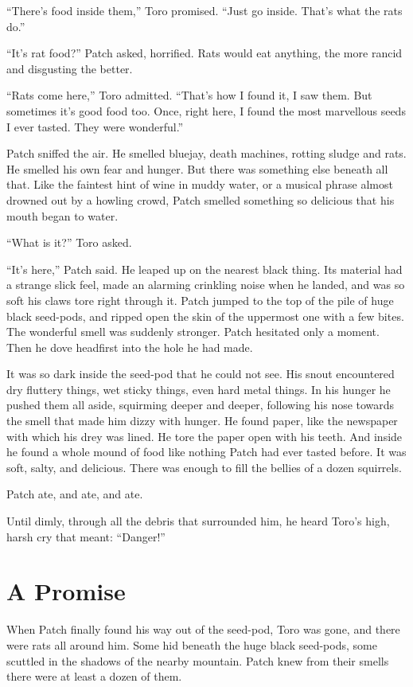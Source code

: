 \documentclass[ebook,oneside,openany,17pt]{memoir}
\newenvironment{tolerant}[1]{%
  \par\tolerance=#1\relax
}{%
  \par
}
\renewcommand{\thechapter}{\Roman{chapter}}
\newcounter{sections}
\newcommand{\sections}[1]{%
  \section*{#1}
  \addtocounter{sections}{1}%
  \pdfbookmark[1]{#1}{section.\thechapter.\thesections}}
\begin{document}
“There’s food inside them,” Toro promised. “Just go inside. That’s
what the rats do.”

“It’s rat food?” Patch asked, horrified. Rats would eat anything, the
more rancid and disgusting the better.

“Rats come here,” Toro admitted. “That’s how I found it, I saw
them. But sometimes it’s good food too. Once, right here, I found the
most marvellous seeds I ever tasted. They were wonderful.”

Patch sniffed the air. He smelled bluejay, death machines, rotting
sludge and rats. He smelled his own fear and hunger. But there was
something else beneath all that. Like the faintest hint of wine in
muddy water, or a musical phrase almost drowned out by a howling
crowd, Patch smelled something so delicious that his mouth began to
water.

“What is it?” Toro asked.

“It’s here,” Patch said. He leaped up on the nearest black thing. Its
material had a strange slick feel, made an alarming crinkling noise
when he landed, and was so soft his claws tore right through it. Patch
jumped to the top of the pile of huge black seed-pods, and ripped open
the skin of the uppermost one with a few bites. The wonderful smell
was suddenly stronger. Patch hesitated only a moment. Then he dove
headfirst into the hole he had made.

It was so dark inside the seed-pod that he could not see. His snout
encountered dry fluttery things, wet sticky things, even hard metal
things. In his hunger he pushed them all aside, squirming deeper and
deeper, following his nose towards the smell that made him dizzy with
hunger. He found paper, like the newspaper with which his drey was
lined. He tore the paper open with his teeth. And inside he found a
whole mound of food like nothing Patch had ever tasted before. It was
soft, salty, and delicious. There was enough to fill the bellies of a
dozen squirrels.

Patch ate, and ate, and ate.

\begin{tolerant}{500}
Until dimly, through all the debris that surround\-ed him, he heard
Toro’s high, harsh cry that meant: “Danger!”
\end{tolerant}


\sections{A Promise}

When Patch finally found his way out of the seed-pod, Toro was gone,
and there were rats all around him. Some hid beneath the huge black
seed-pods, some scuttled in the shadows of the nearby mountain. Patch
knew from their smells there were at least a dozen of them.
\end{document}
